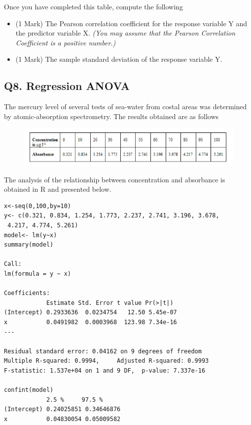 \documentclass[a4paper,12pt]{article}
\begin{document}
Once you have completed this table, compute the following
\begin{itemize}
	\item (1 Mark) The Pearson correlation coefficient for the response variable Y and the predictor variable X.\textit{ (You may assume that the Pearson Correlation Coefficient is a positive number.)}
	\item (1 Mark) The sample standard deviation of the response variable Y.
\end{itemize}
\newpage
\subsection*{Q8. Regression ANOVA}
The mercury level of several tests of sea-water from costal areas was determined by atomic-absorption spectrometry. The results obtained are as follows

\begin{figure}[h!]
\centering
\includegraphics[width=1.1\linewidth]{images/regressionData}
\end{figure}

The analysis of the relationship between concentration and absorbance is obtained in R and presented below. 
\begin{framed}
\begin{verbatim}
x<-seq(0,100,by=10)
y<- c(0.321, 0.834, 1.254, 1.773, 2.237, 2.741, 3.196, 3.678, 
 4.217, 4.774, 5.261)
model<- lm(y~x)
summary(model)

Call:
lm(formula = y ~ x)

Coefficients:
            Estimate Std. Error t value Pr(>|t|)    
(Intercept) 0.2933636  0.0234754   12.50 5.45e-07 
x           0.0491982  0.0003968  123.98 7.34e-16 
---

Residual standard error: 0.04162 on 9 degrees of freedom
Multiple R-squared: 0.9994,     Adjusted R-squared: 0.9993 
F-statistic: 1.537e+04 on 1 and 9 DF,  p-value: 7.337e-16 

confint(model)
            2.5 %     97.5 %
(Intercept) 0.24025851 0.34646876
x           0.04830054 0.05009582

\end{verbatim}
\end{framed}
\end{document}
